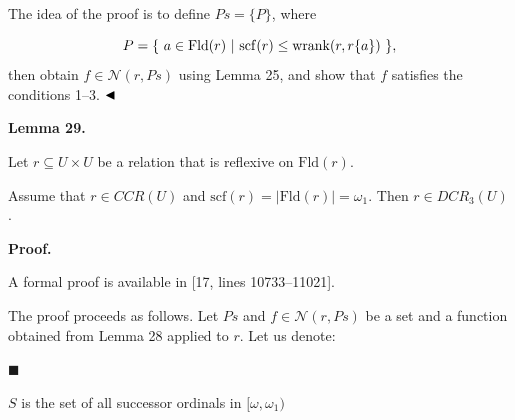 
The idea of the proof is to define $Ps=\{P\}$, where\par
    \[P=\{\leavevmode\nobreak\ a\in\mathrm{Fld}(r)\leavevmode\nobreak\ |\leavevmode%
\nobreak\ \mathrm{scf}(r)\leq\mathrm{wrank}(r,r\{a\})\leavevmode\nobreak\ \},\]    
then obtain $f\in\mathcal{N}(r,Ps)$ using Lemma 25, and show that $f$ satisfies the conditions 1–3. $\hfill\blacktriangleleft$\par
 
 
 
\par\medskip\noindent\textbf{Lemma 29.}\par
 
 
Let $r\subseteq U\times U$ be a relation that is reflexive on $\mathrm{Fld}(r)$.\par
 
 
 
Assume that $r\in CCR(U)$ and $\mathrm{scf}(r)=|\mathrm{Fld}(r)|=\omega_{1}$. Then $r\in DCR_{3}(U)$.\par
 
 
 
 
 
\par\medskip\noindent\textbf{Proof.}\par
 
 
A formal proof is available in [17, lines 10733–11021].\par
 
 
 
The proof proceeds as follows. Let $Ps$ and $f\in\mathcal{N}(r,Ps)$ be a set and a function obtained from Lemma 28 applied to $r$. Let us denote:\par
  
\par\noindent  $\blacksquare$ 
 
$S$ is the set of all successor ordinals in $[\omega,\omega_{1})$\par
 
